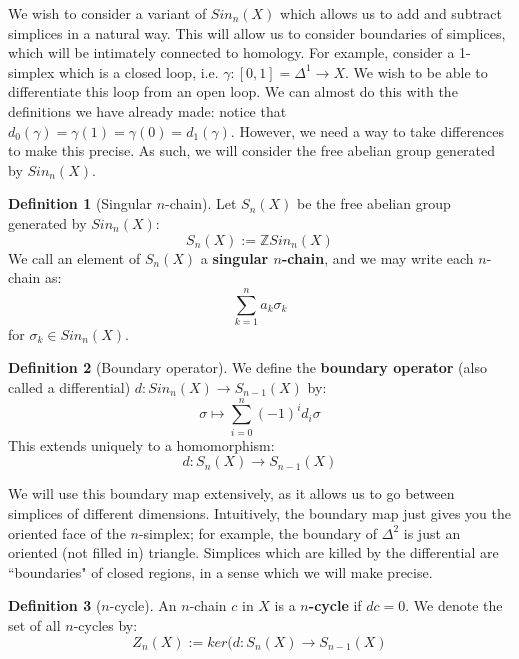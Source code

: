 \documentclass[12pt, oneside]{article}   	%
\theoremstyle{definition}
\newtheorem{definition}{Definition}[section]
\begin{document}
We wish to consider a variant of $Sin_n(X)$ which allows us to add and subtract simplices in a natural 
way. This will allow us to consider boundaries of simplices, which will be intimately connected to homology.  
For example, consider a 1-simplex which is a closed loop, i.e. $\gamma : [0, 1] = \Delta^1\rightarrow X$. 
We wish to be able to differentiate this loop from an open loop. We can almost do this with the definitions 
we have already made: notice that $d_0(\gamma) = \gamma(1) = \gamma(0) = d_1(\gamma)$. However, 
we need a way to take differences to make this precise. As such, we will consider the free abelian 
group generated by $Sin_n(X)$.
\begin{definition}[Singular $n$-chain]
	Let $S_n(X)$ be the free abelian group generated by $Sin_n(X)$:
	\begin{equation}
		S_n(X) := \mathbb Z Sin_n(X)
	\end{equation}
	We call an element of $S_n(X)$ a \textbf{singular $n$-chain}, and we may write each $n$-chain as:
	\begin{equation}
		\sum_{k = 1}^n a_k\sigma_k
	\end{equation}
	for $\sigma_k\in Sin_n(X)$. 
\end{definition}

\begin{definition}[Boundary operator]
	We define the \textbf{boundary operator} (also called a differential) $d : Sin_n(X)\rightarrow 
	S_{n - 1}(X)$ by:
	\begin{equation}
		\sigma\mapsto\sum_{i = 0}^n (-1)^i d_i\sigma
	\end{equation}
	This extends uniquely to a homomorphism:
	\begin{equation}
		d : S_n(X)\rightarrow S_{n - 1}(X)
	\end{equation}
\end{definition}

We will use this boundary map extensively, as it allows us to go between simplices of different dimensions. 
Intuitively, the boundary map just gives you the oriented face of the $n$-simplex; for example, the 
boundary of $\Delta^2$ is just an oriented (not filled in) triangle. Simplices which are killed by the 
differential are ``boundaries" of closed regions, in a sense which we will make precise.

\begin{definition}[$n$-cycle]
	An $n$-chain $c$ in $X$ is a \textbf{$n$-cycle} if $dc = 0$. We denote the set of all $n$-cycles by:
	\begin{equation}
		Z_n(X) := ker(d : S_n(X)\rightarrow S_{n - 1}(X)
	\end{equation}
\end{definition}
\end{document}
